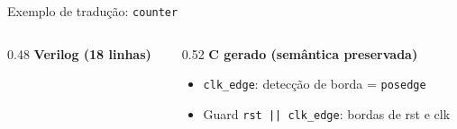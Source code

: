 \documentclass[10pt, aspectratio=169]{beamer}
\newcommand{\code}[1]{\texttt{\small #1}}
\begin{document}
\begin{frame}{Exemplo de tradução: \code{counter}}
  \begin{columns}[t]
    \begin{column}{0.48\textwidth}
      \textbf{Verilog (18 linhas)}
      
    \end{column}
    \begin{column}{0.52\textwidth}
      \textbf{C gerado (semântica preservada)}
      
      \begin{itemize}
        \item \code{clk\_edge}: detecção de borda = \code{posedge}
        \item Guard \code{rst || clk\_edge}: bordas de rst e clk
      \end{itemize}
    \end{column}
  \end{columns}
\end{frame}
\end{document}
